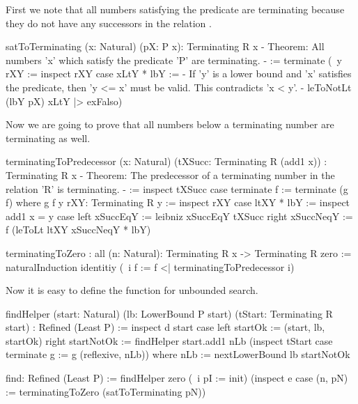First we note that all numbers satisfying the predicate  are terminating
because they do not have any successors in the relation .

\begin{alba}
    satToTerminating (x: Natural) (pX: P x): Terminating R x
    {- Theorem: All numbers 'x' which satisfy the predicate 'P' are
       terminating. -}
    :=
        terminate
            (\ y rXY :=
                inspect rXY case
                    xLtY * lbY :=
                        {- If 'y' is a lower bound and 'x' satisfies the
                           predicate, then 'y <= x' must be valid. This
                           contradicts 'x < y'. -}
                        leToNotLt (lbY pX) xLtY |> exFalso)
\end{alba}



Now we are going to prove that all numbers below a terminating number are
terminating as well.
%
\begin{alba}
    terminatingToPredecessor
        (x: Natural)
        (tXSucc: Terminating R (add1 x))
        : Terminating R x
    {- Theorem: The predecessor of a terminating number in the relation 'R'
       is terminating. -}
    :=
        inspect tXSucc case
            terminate f :=
                terminate (g f)
        where
            g f y rXY: Terminating R y :=
                inspect rXY case
                    ltXY * lbY :=
                        inspect add1 x = y case
                            left xSuccEqY :=
                                leibniz xSuccEqY tXSucc
                            right xSuccNeqY :=
                                f (leToLt ltXY xSuccNeqY * lbY)

    terminatingToZero
        : all (n: Natural): Terminating R x -> Terminating R zero
    :=
        naturalInduction
            identitiy
            (\ i f := f <| terminatingToPredecessor i)
\end{alba}

Now it is easy to define the function for unbounded search.

\begin{alba}
    findHelper
        (start: Natural)
        (lb: LowerBound P start)
        (tStart: Terminating R start)
        : Refined (Least P)
    :=
        inspect d start case
            left startOk :=
                (start, lb, startOk)
            right startNotOk :=
                findHelper
                    start.add1
                    nLb
                    (inspect tStart case
                        terminate g :=
                            g (reflexive, nLb))
                where
                    nLb := nextLowerBound lb startNotOk

    find: Refined (Least P) :=
        findHelper
            zero
            (\ i pI := init)
            (inspect e case
                (n, pN) :=
                    terminatingToZero (satToTerminating pN))
\end{alba}

